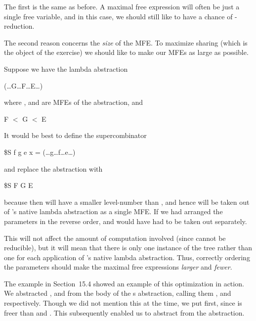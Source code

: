 The first is the same as before. A maximal free expression will often be just
a single free variable, and in this case, we should still like to have a chance of
\ml{\te}-reduction.

The second reason concerns the \textit{size} of the MFE. To maximize sharing
(which is the object of the exercise) we should like to make our MFEs as large
as possible.

Suppose we have the lambda abstraction

\begin{mlcoded}
    (\ldots G\ldots F\ldots E\ldots)
\end{mlcoded}

\noindent
where ,  and  are MFEs of the  abstraction, and

\begin{mlcoded}
     F $<$  G $<$  E
\end{mlcoded}

\noindent
It would be best to define the supercombinator

\begin{mlcoded}
    \$S f g e x = (\ldots g\ldots f\ldots e\ldots)
\end{mlcoded}

\noindent
and replace the abstraction with

\begin{mlcoded}
    \$S F G E
\end{mlcoded}

\noindent
because then  will have a smaller level-number than , and hence will
be taken out of 's native lambda abstraction as a single MFE. If we had
arranged the parameters in the reverse order,  and  would have had to be
taken out separately.

This will not affect the amount of computation involved (since 
cannot be reducible), but it will mean that there is only one instance of the
 tree rather than one for each application of 's native lambda
abstraction. Thus, correctly ordering the parameters should make the
maximal free expressions \textit{larger} and \textit{fewer}.

The example in Section~15.4 showed an example of this optimization in
action. We abstracted ,  and  from the body of the s
abstraction, calling them ,  and  respectively. Though we did not
mention this at the time, we put  first, since  is freer than 
and . This subsequently enabled us to abstract  from the
 abstraction.

